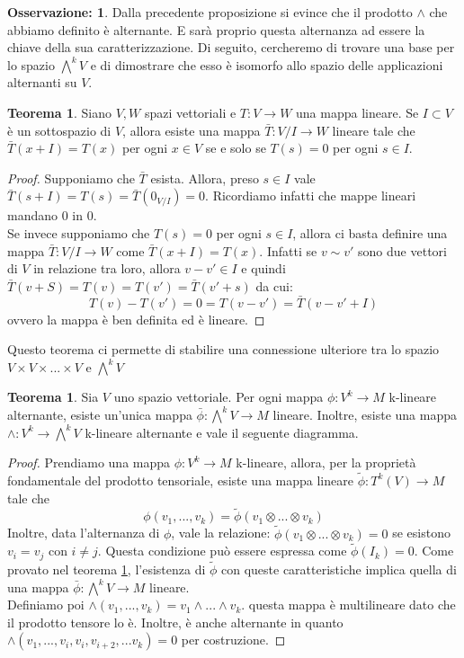 \documentclass[12pt,a4paper]{report}
\theoremstyle{definition}
\theoremstyle{Theorem}
\newtheorem{Theo}[Def]{Teorema}
\theoremstyle{definition}
\theoremstyle{definition}
\theoremstyle{definition}
\newtheorem{Obs}[Def]{Osservazione:}
\begin{document}
\begin{Obs}
	Dalla precedente proposizione si evince che il prodotto $\wedge$ che abbiamo definito è alternante. E sarà proprio questa alternanza ad essere la chiave della sua caratterizzazione. Di seguito, cercheremo di trovare una base per lo spazio $\bigwedge^kV$ e di dimostrare che esso è isomorfo allo spazio delle applicazioni alternanti su $V$.
\end{Obs}
\begin{Theo} \label{Theo 1}
	Siano $V,W$ spazi vettoriali e $T:V\rightarrow W$ una mappa lineare. Se $I\subset V$ è un sottospazio di $V$, allora esiste una mappa $\bar{T}:V/I\rightarrow W$ lineare tale che $\bar{T}(x+I)=T(x)$ per ogni $x\in V$ se e solo se $T(s)=0$ per ogni $s\in I$.
\end{Theo}
\begin{proof}
	Supponiamo che $\bar{T}$ esista. Allora, preso $s\in I$ vale $\bar{T}(s+I)=T(s)=\bar{T}(0_{V/I})=0$. Ricordiamo infatti che mappe lineari mandano 0 in 0.\\
	Se invece supponiamo che $T(s)=0$ per ogni $s\in I$, allora ci basta definire una mappa $\bar{T}:V/I\rightarrow W$ come $\bar{T}(x+I)=T(x)$. Infatti se $v\sim v'$ sono due vettori di $V$ in relazione tra loro, allora $v-v'\in I$ e quindi $\bar{T}(v+S)=T(v)=T(v')=\bar{T}(v'+s)$ da cui:
	$$T(v)-T(v')=0=T(v-v')=\bar{T}(v-v'+I)$$ ovvero la mappa è ben definita ed è lineare.
\end{proof}
Questo teorema ci permette di stabilire una connessione ulteriore tra lo spazio $V\times V\times...\times V$ e $\bigwedge^kV$
\begin{Theo}
	Sia $V$ uno spazio vettoriale. Per ogni mappa $\phi:V^k\rightarrow M$ k-lineare alternante, esiste un'unica mappa $\bar{\phi}:\bigwedge^kV\rightarrow M$ lineare. Inoltre, esiste una mappa $\wedge:V^k\rightarrow\bigwedge^kV$ k-lineare alternante e vale il seguente diagramma.
\end{Theo}
\begin{center}
\end{center}
\begin{proof}
	Prendiamo una mappa $\phi:V^k\rightarrow M$ k-lineare, allora, per la proprietà fondamentale del prodotto tensoriale, esiste una mappa lineare $\tilde{\phi}:T^k(V)\rightarrow M$ tale che $$\phi(v_1,...,v_k)=\tilde{\phi}(v_1\otimes...\otimes v_k)$$ 
	Inoltre, data l'alternanza di $\phi$, vale la relazione: $\tilde{\phi}(v_1\otimes...\otimes v_k)=0$ se esistono $v_i=v_j$ con $i\neq j$. Questa condizione può essere espressa come $\tilde{\phi}(I_k)=0$.
	Come provato nel teorema \ref{Theo 1}, l'esistenza di $\tilde{\phi}$ con queste caratteristiche implica quella di una mappa $\bar{\phi}:\bigwedge^kV\rightarrow M$ lineare.\\
	Definiamo poi $\wedge(v_1,...,v_k)=v_1\wedge...\wedge v_k$. questa mappa è multilineare dato che il prodotto tensore lo è. Inoltre, è anche alternante in quanto $\wedge(v_1,...,v_i,v_i,v_{i+2},...v_k)=0$ per costruzione.
\end{proof}
\end{document}
